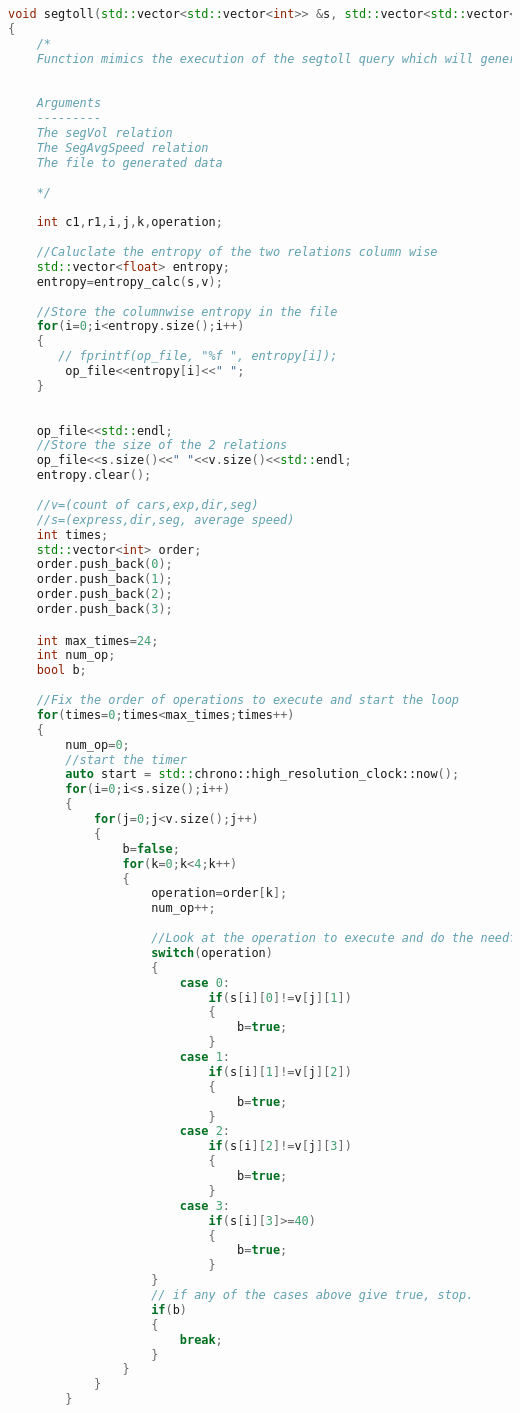 \begin{lstlisting}[language=C++, caption=The SegToll query which will generate data for DQNs, label={lst:SegToll}]
void segtoll(std::vector<std::vector<int>> &s, std::vector<std::vector<int>> &v, std::ofstream &op_file)
{   
    /*
    Function mimics the execution of the segtoll query which will generate the data required for training and evaluating the DQN
    
    
    Arguments
    ---------
    The segVol relation
    The SegAvgSpeed relation
    The file to generated data
    
    */    
    
    int c1,r1,i,j,k,operation;
    
    //Caluclate the entropy of the two relations column wise
    std::vector<float> entropy;
    entropy=entropy_calc(s,v);
    
    //Store the columnwise entropy in the file
    for(i=0;i<entropy.size();i++)
    {
       // fprintf(op_file, "%f ", entropy[i]);
        op_file<<entropy[i]<<" ";
    }
    
    
    op_file<<std::endl;
    //Store the size of the 2 relations
    op_file<<s.size()<<" "<<v.size()<<std::endl;
    entropy.clear();
    
    //v=(count of cars,exp,dir,seg)
    //s=(express,dir,seg, average speed)
    int times;
    std::vector<int> order;
    order.push_back(0);
    order.push_back(1);
    order.push_back(2);
    order.push_back(3);

    int max_times=24;
    int num_op;
    bool b;
    
    //Fix the order of operations to execute and start the loop
    for(times=0;times<max_times;times++)
    {
        num_op=0;
        //start the timer
        auto start = std::chrono::high_resolution_clock::now();
        for(i=0;i<s.size();i++)
        {
            for(j=0;j<v.size();j++)
            {
                b=false;
                for(k=0;k<4;k++)
                {
                    operation=order[k];
                    num_op++;
                    
                    //Look at the operation to execute and do the needful
                    switch(operation)
                    {
                        case 0:
                            if(s[i][0]!=v[j][1])
                            {
                                b=true;
                            }
                        case 1:
                            if(s[i][1]!=v[j][2])
                            {
                                b=true;
                            }
                        case 2:
                            if(s[i][2]!=v[j][3])
                            {
                                b=true;
                            }
                        case 3:
                            if(s[i][3]>=40)
                            {
                                b=true;
                            }
                    }
                    // if any of the cases above give true, stop.  
                    if(b)
                    {
                        break;
                    }
                }
            }
        }
        

\end{lstlisting}
